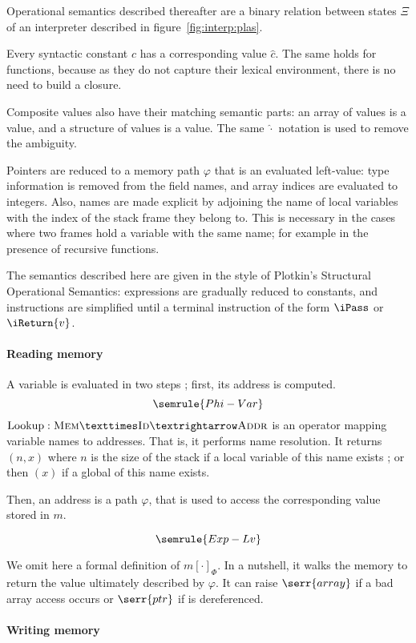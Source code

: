 Operational semantics described thereafter are a binary relation between states
$Ξ$ of an interpreter described in figure~\ref{fig:interp:plas}.

Every syntactic constant $c$ has a corresponding value $\widehat{c}$. The same
holds for functions, because as they do not capture their lexical
environment, there is no need to build a closure.

Composite values also have their matching semantic parts: an array of values is
a value, and a structure of values is a value. The same $\widehat{\cdot}$
notation is used to remove the ambiguity.

Pointers are reduced to a memory path $φ$ that is an evaluated left-value: type
information is removed from the field names, and array indices are evaluated to
integers. Also, names are made explicit by adjoining the name of local variables
with the index of the stack frame they belong to. This is necessary in the cases
where two frames hold a variable with the same name; for example in the presence
of recursive functions.

The semantics described here are given in the style of Plotkin's Structural
Operational Semantics\cite{sos-jlap}: expressions are gradually reduced to
constants, and instructions are simplified until a terminal instruction of the
form $\iPass$ or $\iReturn{v}$.

\paragraph{Reading memory}

A variable is evaluated in two steps ; first, its address is computed.%
{ \small \[
  \semrule{Phi-Var}
\] }%
$\mathrm{Lookup} : \textsc{Mem} × \textsc{Id} → \textsc{Addr}$
is an operator mapping variable names to addresses. That is,
it performs name resolution. It returns $(n, x)$ where $n$ is the size of the
stack if a local variable of this name exists ; or then $(x)$ if a global of
this name exists.

Then, an address is a path $φ$, that is used to access the corresponding value
stored in $m$.

{\small \[
  \semrule{Exp-Lv}
\]}%

We omit here a formal definition of $m[\cdot]_Φ$. In a nutshell, it walks the
memory to return the value ultimately described by $φ$. It can raise
$\serr{array}$ if a bad array access occurs or $\serr{ptr}$ if \eNull is
dereferenced.

\paragraph{Writing memory}

